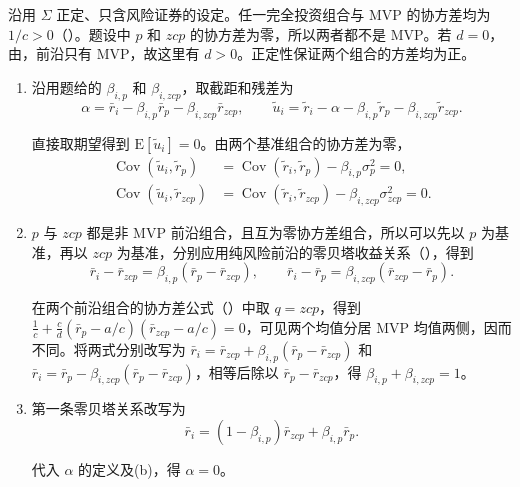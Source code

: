 \begin{solution}[label-content={证明}]
沿用 $\Sigma$ 正定、只含风险证券的设定。任一完全投资组合与 MVP 的协方差均为 $1/c>0$\ifdefined\WJHandoutKnowledge（）\fi。题设中 $p$ 和 $zcp$ 的协方差为零，所以两者都不是 MVP。若 $d=0$，由，前沿只有 MVP，故这里有 $d>0$。正定性保证两个组合的方差均为正。
\begin{enumerate}[label=(\alph*)]
\item 沿用题给的 $\beta_{i,p}$ 和 $\beta_{i,zcp}$，取截距和残差为
\[
 \alpha=\bar r_i-\beta_{i,p}\bar r_p-\beta_{i,zcp}\bar r_{zcp},\qquad
 \widetilde u_i=\widetilde r_i-\alpha-\beta_{i,p}\widetilde r_p-\beta_{i,zcp}\widetilde r_{zcp}.
\]

直接取期望得到 $\mathrm E[\widetilde u_i]=0$。由两个基准组合的协方差为零，
\[
 \begin{aligned}
 \operatorname{Cov}(\widetilde u_i,\widetilde r_p)&=\operatorname{Cov}(\widetilde r_i,\widetilde r_p)-\beta_{i,p}\sigma_p^2=0,\\
 \operatorname{Cov}(\widetilde u_i,\widetilde r_{zcp})&=\operatorname{Cov}(\widetilde r_i,\widetilde r_{zcp})-\beta_{i,zcp}\sigma_{zcp}^2=0.
 \end{aligned}
\]

\item $p$ 与 $zcp$ 都是非 MVP 前沿组合，且互为零协方差组合，所以可以先以 $p$ 为基准，再以 $zcp$ 为基准，分别应用纯风险前沿的零贝塔收益关系\ifdefined\WJHandoutKnowledge（）\fi，得到
\[
 \bar r_i-\bar r_{zcp}=\beta_{i,p}(\bar r_p-\bar r_{zcp}),\qquad
 \bar r_i-\bar r_p=\beta_{i,zcp}(\bar r_{zcp}-\bar r_p).
\]

在两个前沿组合的协方差公式\ifdefined\WJHandoutKnowledge（）\fi 中取 $q=zcp$，得到 $\tfrac1c+\tfrac cd(\bar r_p-a/c)(\bar r_{zcp}-a/c)=0$，可见两个均值分居 MVP 均值两侧，因而不同。将两式分别改写为 $\bar r_i=\bar r_{zcp}+\beta_{i,p}(\bar r_p-\bar r_{zcp})$ 和 $\bar r_i=\bar r_p-\beta_{i,zcp}(\bar r_p-\bar r_{zcp})$，相等后除以 $\bar r_p-\bar r_{zcp}$，得 $\beta_{i,p}+\beta_{i,zcp}=1$。

\item 第一条零贝塔关系改写为
\[
 \bar r_i=(1-\beta_{i,p})\bar r_{zcp}+\beta_{i,p}\bar r_p.
\]

代入 $\alpha$ 的定义及(b)，得 $\alpha=0$。\qedhere
\end{enumerate}
\end{solution}

